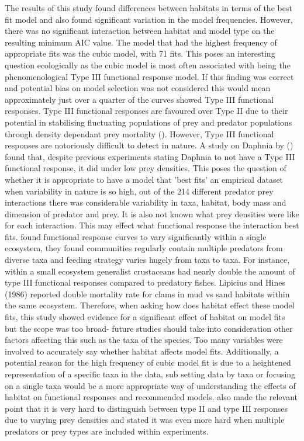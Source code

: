 \documentclass[11pt]{article}
\begin{document}
The results of this study found differences between habitats in terms of the best fit model and also found significant variation in the model frequencies. However, there was no significant interaction between habitat and model type on the resulting minimum AIC value. The model that had the highest frequency of appropriate fits was the cubic model, with 71 fits. This poses an interesting question ecologically as the cubic model is most often associated with being the phenomenological Type III functional response model. If this finding was correct and potential bias on model selection was not considered this would mean approximately just over a quarter of the curves showed Type III functional responses. Type III functional responses are favoured over Type II due to their potential in stabilising fluctuating populations of prey and predator populations through density dependant prey mortality (\cite{Sarnelle2008}). However, Type III functional responses are notoriously difficult to detect in nature. A study on Daphnia by (\cite{Sarnelle2008}) found that, despite previous experiments stating Daphnia to not have a Type III functional response, it did under low prey densities. This poses the question of whether it is appropriate to have a model that 'best fits' an empirical dataset when variability in nature is so high, out of the 214 different predator prey interactions there was considerable variability in taxa, habitat, body mass and dimension of predator and prey. It is also not known what prey densities were like for each interaction. This may effect what functional response the interaction best fits. \cite{Dunn2020} found functional response curves to vary significantly within a single ecosystem, they found communities regularly contain multiple predators from diverse taxa and feeding strategy varies hugely from taxa to taxa. For instance, within a small ecosystem generalist crustaceans had nearly double the amount of type III functional responses compared to predatory fishes. Lipicius and Hines (1986) reported double mortality rate for clams in mud vs sand habitats within the same ecosystem. Therefore, when asking how does habitat effect these model fits, this study showed evidence for a significant effect of habitat on model fits but the scope was too broad- future studies should take into consideration other factors affecting this such as the taxa of the species. Too many variables were involved to accurately say whether habitat affects model fits. Additionally, a potential reason for the high frequency of cubic model fit is due to a heightened representation of a specific taxa in the data, sub setting data by taxa or focusing on a single taxa would be a more appropriate way of understanding the effects of habitat on functional responses and recommended models. \cite{Dunn2020} also made the relevant point that it is very hard to distinguish between type II and type III responses due to varying prey densities and stated it was even more hard when multiple predators or prey types are included within experiments. 
\end{document}
